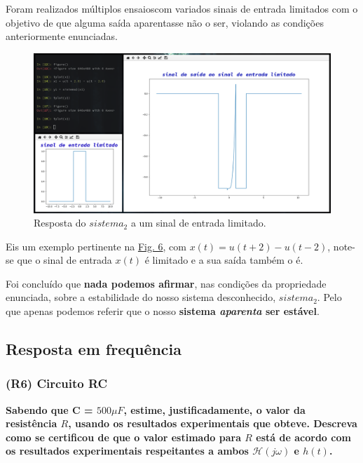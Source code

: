 Foram realizados múltiplos ensaios\footnotemark[2] com variados sinais de entrada limitados com o objetivo de que alguma saída aparentasse não o ser, violando as condições anteriormente enunciadas.

\begin{figure}[ht]
    \centering
    \includegraphics[width = 0.5\linewidth]{prints/estabilidade1.png}
    \caption{Resposta do \(sistema_2\) a um sinal de entrada limitado.}
    \label{fig:estabilidade1}
\end{figure}

Eis um exemplo pertinente na \hyperref[fig:estabilidade1]{Fig. 6}, com \(x(t) = u(t+2) - u(t-2)\), note-se que o sinal de entrada \(x(t)\) é limitado e a sua saída também o é.

Foi concluído que \textbf{nada podemos afirmar}\footnotemark[3], nas condições da propriedade enunciada, sobre a estabilidade do nosso sistema desconhecido, \(sistema_2\). Pelo que apenas podemos referir que o nosso \textbf{sistema \textit{aparenta} ser estável}.



\clearpage

\subsection{\bf{Resposta em frequência}}
\label{subsec:respostafreq}
\subsubsection{(R6) Circuito RC}
\label{subsubsec:R6}
\textbf{Sabendo que C = \(500 \mu F\), estime, justificadamente, o valor da resistência \(R\), usando os resultados experimentais que obteve. Descreva como se certificou de que o valor estimado para \(R\) está de acordo com os resultados experimentais respeitantes a ambos \(\mathcal{H}(j \omega)\) e \(h(t)\).}

